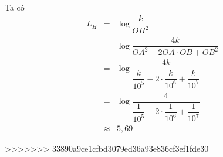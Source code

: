 \begin{ex}
{\begin{itemize}
\begin{center}
			\end{center}
			Ta có
			\allowdisplaybreaks
			\begin{eqnarray*}
				L_{H}&=&\log \dfrac{k}{OH^{2}}\\
				&=&\log \dfrac{4k}{OA^{2}-2OA\cdot OB+OB^{2}}\\
				&=&\log \dfrac{4k}{\dfrac{k}{10^{5}}-2\cdot \dfrac{k}{10^{6}}+\dfrac{k}{10^{7}}}\\
				&=&\log \dfrac{4}{\dfrac{1}{10^{5}}-2\cdot \dfrac{1}{10^{6}}+\dfrac{1}{10^{7}}}\\
				&\approx& 5{,}69
			\end{eqnarray*}
		\end{itemize}	
	}
\end{ex}
>>>>>>> 33890a9ce1cfbd3079ed36a93e836cf3ef1fde30
